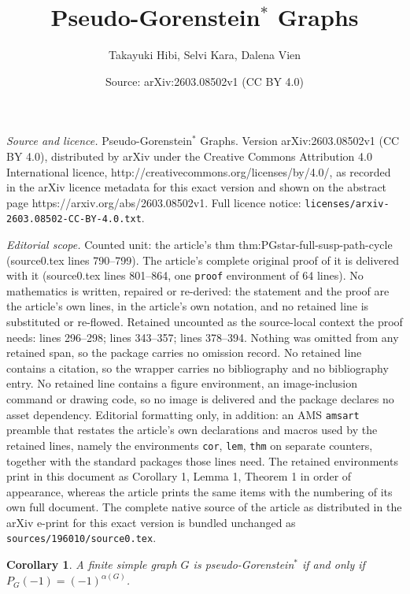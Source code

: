 \documentclass[10pt,a4paper]{amsart}
\title{Pseudo-Gorenstein$^{*}$ Graphs}
\author{Takayuki Hibi, Selvi Kara, Dalena Vien}
\date{Source: arXiv:2603.08502v1 (CC BY 4.0)}
\newtheorem{cor}{Corollary}
\begin{document}
\maketitle

\noindent\emph{Source and licence.} Pseudo-Gorenstein$^{*}$ Graphs. Version arXiv:2603.08502v1 (CC BY 4.0), distributed by arXiv under the Creative Commons Attribution 4.0 International licence, http://creativecommons.org/licenses/by/4.0/, as recorded in the arXiv licence metadata for this exact version and shown on the abstract page https://arxiv.org/abs/2603.08502v1. Full licence notice: \texttt{licenses/arxiv-2603.08502-CC-BY-4.0.txt}.\par\smallskip

\noindent\textit{Editorial scope.} Counted unit: the article's thm thm:PGstar-full-susp-path-cycle (source0.tex lines 790--799). The article's complete original proof of it is delivered with it (source0.tex lines 801--864, one \texttt{proof} environment of 64 lines). No mathematics is written, repaired or re-derived: the statement and the proof are the article's own lines, in the article's own notation, and no retained line is substituted or re-flowed.  Retained uncounted as the source-local context the proof needs: lines 296--298; lines 343--357; lines 378--394.  Nothing was omitted from any retained span, so the package carries no omission record.  No retained line contains a citation, so the wrapper carries no bibliography and no bibliography entry.  No retained line contains a figure environment, an image-inclusion command or drawing code, so no image is delivered and the package declares no asset dependency.  Editorial formatting only, in addition: an AMS \texttt{amsart} preamble that restates the article's own declarations and macros used by the retained lines, namely the environments \texttt{cor}, \texttt{lem}, \texttt{thm} on separate counters, together with the standard packages those lines need.  The retained environments print in this document as Corollary 1, Lemma 1, Theorem 1 in order of appearance, whereas the article prints the same items with the numbering of its own full document.  The complete native source of the article as distributed in the arXiv e-print for this exact version is bundled unchanged as \texttt{sources/196010/source0.tex}.
\begin{cor}\label{cor:PGstar-criterion}
A finite simple graph \(G\) is pseudo-Gorenstein\(^{*}\) if and only if \(P_G(-1)=(-1)^{\alpha(G)}\).
\end{cor}
\end{document}
